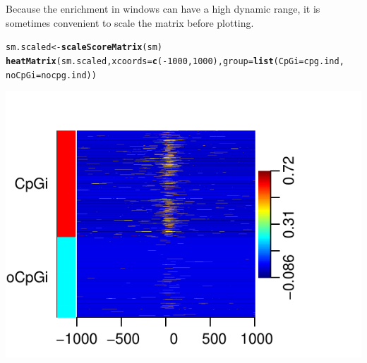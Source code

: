 \documentclass{article}\usepackage[]{graphicx}\usepackage[]{color}
\makeatletter
\def\maxwidth{ %
  \ifdim\Gin@nat@width>\linewidth
    \linewidth
  \else
    \Gin@nat@width
  \fi
}
\newcommand{\hlnum}[1]{\textcolor[rgb]{0.686,0.059,0.569}{#1}}%
\newcommand{\hlopt}[1]{\textcolor[rgb]{0,0,0}{#1}}%
\newcommand{\hlstd}[1]{\textcolor[rgb]{0.345,0.345,0.345}{#1}}%
\newcommand{\hlkwb}[1]{\textcolor[rgb]{0.69,0.353,0.396}{#1}}%
\newcommand{\hlkwc}[1]{\textcolor[rgb]{0.333,0.667,0.333}{#1}}%
\newcommand{\hlkwd}[1]{\textcolor[rgb]{0.737,0.353,0.396}{\textbf{#1}}}%
\newenvironment{kframe}{%
 \def\at@end@of@kframe{}%
 \ifinner\ifhmode%
  \def\at@end@of@kframe{\end{minipage}}%
  \begin{minipage}{\columnwidth}%
 \fi\fi%
 \def\FrameCommand##1{\hskip\@totalleftmargin \hskip-\fboxsep
 \colorbox{shadecolor}{##1}\hskip-\fboxsep
     \hskip-\linewidth \hskip-\@totalleftmargin \hskip\columnwidth}%
 \MakeFramed {\advance\hsize-\width
   \@totalleftmargin\z@ \linewidth\hsize
   \@setminipage}}%
 {\par\unskip\endMakeFramed%
 \at@end@of@kframe}
\newenvironment{knitrout}{}{} %
\makeatother
\begin{document}
Because the enrichment in windows can have a high dynamic range, it is sometimes
convenient to scale the matrix before plotting.
\begin{knitrout}
\color{fgcolor}\begin{kframe}
\begin{alltt}
\hlstd{sm.scaled} \hlkwb{<-} \hlkwd{scaleScoreMatrix}\hlstd{(sm)}
\hlkwd{heatMatrix}\hlstd{(sm.scaled,} \hlkwc{xcoords} \hlstd{=} \hlkwd{c}\hlstd{(}\hlopt{-}\hlnum{1000}\hlstd{,} \hlnum{1000}\hlstd{),} \hlkwc{group} \hlstd{=} \hlkwd{list}\hlstd{(}\hlkwc{CpGi} \hlstd{= cpg.ind,}
    \hlkwc{noCpGi} \hlstd{= nocpg.ind))}
\end{alltt}
\end{kframe}

{\centering \includegraphics[width=\maxwidth]{FiguresheatMatrixScales} 

}



\end{knitrout}
\end{document}
